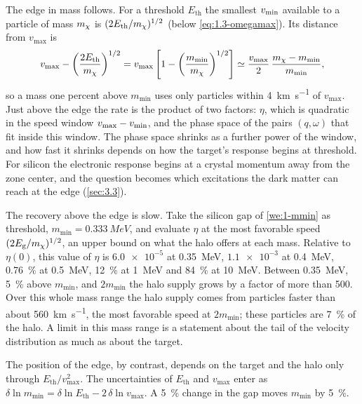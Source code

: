The edge in mass follows. For a threshold $E_{\mathrm{th}}$ the smallest $v_{\mathrm{min}}$ available to a particle of mass $m_{\chi}$ is $(2E_{\mathrm{th}}/m_{\chi})^{1/2}$ (below \cref{eq:1.3-omegamax}). Its distance from $v_{\mathrm{max}}$ is
\begin{equation*}
  v_{\mathrm{max}} - \left(\frac{2E_{\mathrm{th}}}{m_{\chi}}\right)^{1/2} = v_{\mathrm{max}}\left[1 - \left(\frac{m_{\mathrm{min}}}{m_{\chi}}\right)^{1/2}\right] \simeq \frac{v_{\mathrm{max}}}{2}\,\frac{m_{\chi} - m_{\mathrm{min}}}{m_{\mathrm{min}}},
\end{equation*}
so a mass one percent above $m_{\mathrm{min}}$ uses only particles within \SI{4}{km.s^{-1}} of $v_{\mathrm{max}}$. Just above the edge the rate is the product of two factors: $\eta$, which is quadratic in the speed window $v_{\mathrm{max}} - v_{\mathrm{min}}$, and the phase space of the pairs $(q, \omega)$ that fit inside this window. The phase space shrinks as a further power of the window, and how fast it shrinks depends on how the target's response begins at threshold. For silicon the electronic response begins at a crystal momentum away from the zone center, and the question becomes which excitations the dark matter can reach at the edge (\cref{sec:3.3}).

The recovery above the edge is slow. Take the silicon gap of \cref{we:1-mmin} as threshold, $m_{\mathrm{min}} = \SI{0.333}{MeV}$, and evaluate $\eta$ at the most favorable speed $(2E_{\mathrm{g}}/m_{\chi})^{1/2}$, an upper bound on what the halo offers at each mass. Relative to $\eta(0)$, this value of $\eta$ is $\num{6.0e-5}$ at \SI{0.35}{MeV}, $\num{1.1e-3}$ at \SI{0.4}{MeV}, \SI{0.76}{\percent} at \SI{0.5}{MeV}, \SI{12}{\percent} at \SI{1}{MeV} and \SI{84}{\percent} at \SI{10}{MeV}. Between \SI{0.35}{MeV}, \SI{5}{\percent} above $m_{\mathrm{min}}$, and $2m_{\mathrm{min}}$ the halo supply grows by a factor of more than 500. Over this whole mass range the halo supply comes from particles faster than about \SI{560}{km.s^{-1}}, the most favorable speed at $2m_{\mathrm{min}}$; these particles are \SI{7}{\percent} of the halo. A limit in this mass range is a statement about the tail of the velocity distribution as much as about the target.

The position of the edge, by contrast, depends on the target and the halo only through $E_{\mathrm{th}}/v_{\mathrm{max}}^2$. The uncertainties of $E_{\mathrm{th}}$ and $v_{\mathrm{max}}$ enter as $\delta\ln m_{\mathrm{min}} = \delta\ln E_{\mathrm{th}} - 2\,\delta\ln v_{\mathrm{max}}$. A \SI{5}{\percent} change in the gap moves $m_{\mathrm{min}}$ by \SI{5}{\percent}.
